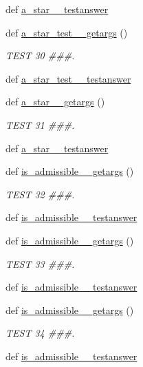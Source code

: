 \begin{DoxyCompactItemize}
\item 
def \hyperlink{namespacetests_af46ba18110dd0dda4e1041843c837139}{a\+\_\+star\+\_\+\_\+testanswer}
\item 
def \hyperlink{namespacetests_adb53392b223a28136afc20bff5e4eea3}{a\+\_\+star\+\_\+test\+\_\+\_\+getargs} ()
\begin{DoxyCompactList}\small\item\em T\+E\+S\+T 30 \#\#\#. \end{DoxyCompactList}\item 
def \hyperlink{namespacetests_a5b62543ce703312bbb9cbd616aff2149}{a\+\_\+star\+\_\+test\+\_\+\_\+testanswer}
\item 
def \hyperlink{namespacetests_a04e28fc331646ba80b61815f993b9f87}{a\+\_\+star\+\_\+\_\+getargs} ()
\begin{DoxyCompactList}\small\item\em T\+E\+S\+T 31 \#\#\#. \end{DoxyCompactList}\item 
def \hyperlink{namespacetests_ab08acf87c3c67437d1b97b3d572f0d81}{a\+\_\+star\+\_\+\_\+testanswer}
\item 
def \hyperlink{namespacetests_af73603e4909ace76275d75b1a5500348}{is\+\_\+admissible\+\_\+\_\+getargs} ()
\begin{DoxyCompactList}\small\item\em T\+E\+S\+T 32 \#\#\#. \end{DoxyCompactList}\item 
def \hyperlink{namespacetests_a38d60ddd78dce58f8e5645d83d453c5e}{is\+\_\+admissible\+\_\+\_\+testanswer}
\item 
def \hyperlink{namespacetests_a983d7c04a049bab21a081088381b03e3}{is\+\_\+admissible\+\_\+\_\+getargs} ()
\begin{DoxyCompactList}\small\item\em T\+E\+S\+T 33 \#\#\#. \end{DoxyCompactList}\item 
def \hyperlink{namespacetests_abef505870d1243467d9aaeeb8ea0d90d}{is\+\_\+admissible\+\_\+\_\+testanswer}
\item 
def \hyperlink{namespacetests_aec45fa981a276db0b93531ec99a01a5e}{is\+\_\+admissible\+\_\+\_\+getargs} ()
\begin{DoxyCompactList}\small\item\em T\+E\+S\+T 34 \#\#\#. \end{DoxyCompactList}\item 
def \hyperlink{namespacetests_aadaaf8c36944aa8b74114947a212dc15}{is\+\_\+admissible\+\_\+\_\+testanswer}

\end{DoxyCompactItemize}
